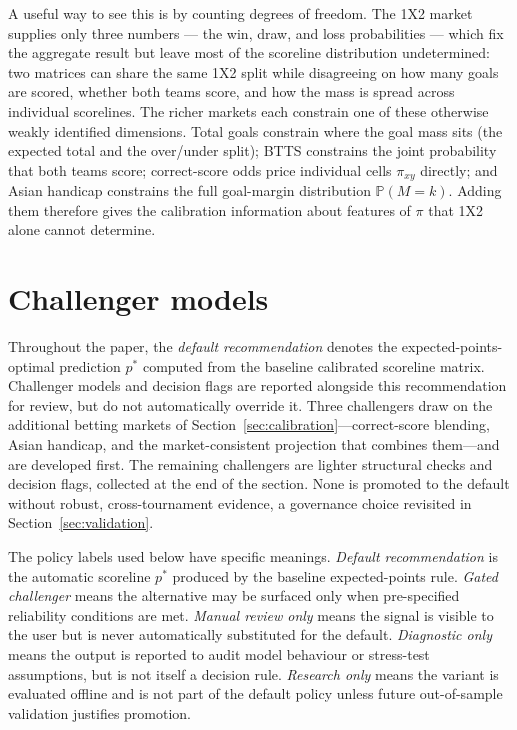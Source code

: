 \documentclass[11pt]{article}
\newcommand{\Prob}{\mathbb{P}}
\begin{document}
A useful way to see this is by counting degrees of freedom. The 1X2 market supplies only three
numbers --- the win, draw, and loss probabilities --- which fix the aggregate result but leave most
of the scoreline distribution undetermined: two matrices can share the same 1X2 split while
disagreeing on how many goals are scored, whether both teams score, and how the mass is spread
across individual scorelines. The richer markets each constrain one of these otherwise weakly identified dimensions. Total goals constrain where the goal mass sits (the expected total and the over/under split); BTTS constrains
the joint probability that both teams score; correct-score odds price individual cells $\pi_{xy}$
directly; and Asian handicap constrains the full goal-margin distribution $\Prob(M=k)$. Adding them
therefore gives the calibration information about features of \(\pi\) that 1X2 alone cannot determine.

\section{Challenger models}
\label{sec:challengers}

Throughout the paper, the \emph{default recommendation} denotes the expected-points-optimal
prediction \(p^{*}\) computed from the baseline calibrated scoreline matrix. Challenger
models and decision flags are reported alongside this recommendation for review, but do
not automatically override it. Three challengers draw on the additional betting markets of Section~\ref{sec:calibration}---correct-score blending, Asian handicap, and the market-consistent projection that combines them---and are developed first. The remaining challengers are lighter structural checks and decision flags, collected at the end of the section. None is promoted to the default without robust, cross-tournament evidence, a governance choice revisited in Section~\ref{sec:validation}.

The policy labels used below have specific meanings. \emph{Default recommendation} is the automatic scoreline \(p^{*}\) produced by the baseline expected-points rule. \emph{Gated challenger} means the alternative may be surfaced only when
pre-specified reliability conditions are met. \emph{Manual review only} means the signal is
visible to the user but is never automatically substituted for the default. \emph{Diagnostic
only} means the output is reported to audit model behaviour or stress-test assumptions, but is
not itself a decision rule. \emph{Research only} means the variant is evaluated offline and is
not part of the default policy unless future out-of-sample validation justifies promotion.
\end{document}

